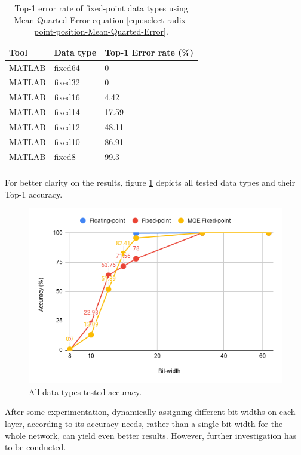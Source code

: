 \begin{table}[H]
	\caption{Top-1 error rate of fixed-point data types using Mean Quarted Error equation \ref{eqn:select-radix-point-position-Mean-Quarted-Error}.}
	\label{tab:fixed-MQE-error-rates}
	\centering
	\begin{tabular}{lll}
		\toprule
		\textbf{Tool} & \textbf{Data type} & \textbf{Top-1 Error rate (\%)}\\
		\midrule
			MATLAB 	& fixed64	& 0 	\\
			MATLAB 	& fixed32	& 0 	\\
			MATLAB 	& fixed16	& 4.42 	\\
			MATLAB 	& fixed14	& 17.59 \\
			MATLAB 	& fixed12	& 48.11 \\
			MATLAB 	& fixed10	& 86.91	\\
			MATLAB 	& fixed8	& 99.3 	\\
		\bottomrule\\
	\end{tabular}
\end{table}

For better clarity on the results, figure \ref{fig:data-types-accuracy-chart} depicts all tested data types and their Top-1 accuracy.

\begin{figure} [H]
	\centering
	\includegraphics[width=\textwidth]{Images/Weights-distributions/data-types-accuracy-chart.png}
	\decoRule
	\caption[All data types tested accuracy]{All data types tested accuracy.}
	\label{fig:data-types-accuracy-chart}
\end{figure}

After some experimentation, dynamically assigning different bit-widths on each layer, according to its accuracy needs, rather than a single bit-width for the whole network, can yield even better results. However, further investigation has to be conducted.

